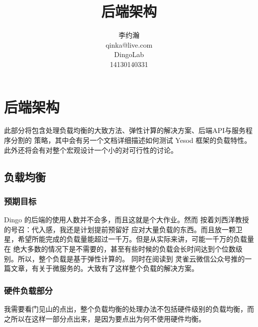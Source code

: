 







\makeatletter
\def\@NoStyleChaper{\ralex} %
\def\@ARCHDoc{\ralex} %
\def\@UsingAppendix{\ralex} %
\def\@DocType{article}
\def\@DocTypeCTEX{ctexart}
\makeatother


\title{后端架构}
\author{李约瀚 \\ qinka@live.com \\ DingoLab \\ 14130140331}


\maketitle
\newpage

\section{后端架构}

此部分将包含处理负载均衡的大致方法、弹性计算的解决方案、后端API与服务程序分割的
策略，其中会有另一个文档详细描述如何测试 Yesod 框架的负载特性。
此外还将会有对整个宏观设计一个小的对可行性的讨论。


\subsection{负载均衡}
\subsubsection{预期目标}
Dingo 的后端的使用人数并不会多，而且这就是个大作业。然而 按着刘西洋教授的号召：代入感，我还是计划提前预留好
应对大量负载的东西。而且放一颗卫星，希望所能完成的负载量能超过一千万。但是从实际来讲，可能一千万的负载量在
绝大多数的情况下是不需要的，甚至有些时候的负载会长时间达到个位数级别。所以，整个负载是基于弹性计算的。
同时在阅读到 灵雀云微信公众号推的一篇文章，有关于微服务的。大致有了这样整个负载的解决方案。
\subsubsection{硬件负载部分}
我需要看门见山的点出，整个负载均衡的处理办法不包括硬件级别的负载均衡，而之所以在这样一部分点出来，是因为要点出为何不使用硬件均衡。

